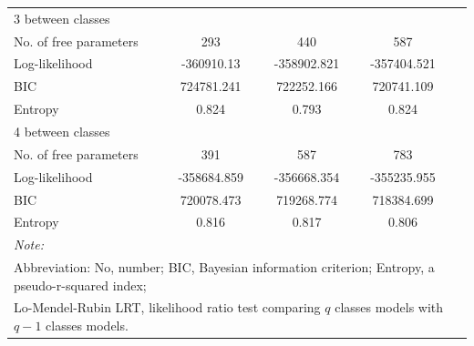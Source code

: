 \begin{table}
\begin{tabular}[t]{lccccc}
		\hspace{1em}3 between classes &  &  &  &  & \\
		\hspace{1em}\hspace{1em}No. of free parameters &  & 293 & 440 & 587 & \\
		\hspace{1em}\hspace{1em}Log-likelihood &  & -360910.13 & -358902.821 & -357404.521 & \\
		\hspace{1em}\hspace{1em}BIC &  & 724781.241 & 722252.166 & 720741.109 & \\
		\hspace{1em}\hspace{1em}Entropy &  & 0.824 & 0.793 & 0.824 & \\
		\hspace{1em}4 between classes &  &  &  &  & \\
		\hspace{1em}\hspace{1em}No. of free parameters &  & 391 & 587 & 783 & \\
		\hspace{1em}\hspace{1em}Log-likelihood &  & -358684.859 & -356668.354 & -355235.955 & \\
		\hspace{1em}\hspace{1em}BIC &  & 720078.473 & 719268.774 & 718384.699 & \\
		\hspace{1em}\hspace{1em}Entropy &  & 0.816 & 0.817 & 0.806 & \\
		\bottomrule
		\multicolumn{6}{l}{\textit{Note: }}\\
		\multicolumn{6}{l}{Abbreviation: No, number; BIC, Bayesian information criterion; Entropy, a pseudo-r-squared index;}\\ 
		\multicolumn{6}{l}{Lo-Mendel-Rubin LRT, likelihood ratio test comparing $q$ classes models with $q-1$ classes models.}\\
	\end{tabular}
\end{table}







